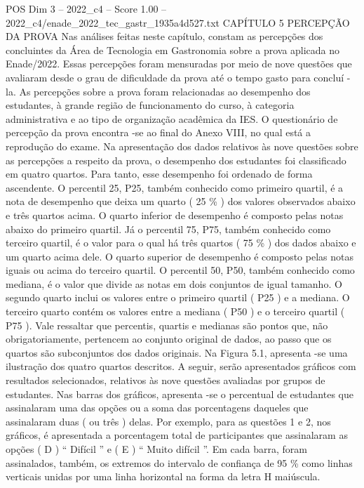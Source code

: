 \begin{textsample}{POS Dim 3 – 2022\_c4 – Score 1.00 – 2022\_c4/enade\_2022\_tec\_gastr\_1935a4d527.txt}  \label{ex:f3_pos_176}
CAPÍTULO 5 PERCEPÇÃO DA PROVA Nas análises feitas neste capítulo, constam as percepções dos concluintes da Área de Tecnologia em Gastronomia sobre a prova aplicada no Enade/2022.
Essas percepções foram mensuradas por meio de nove questões que avaliaram desde o grau de dificuldade da prova até o tempo gasto para concluí -la.
As percepções sobre a prova foram relacionadas ao desempenho dos estudantes, à grande região de funcionamento do curso, à categoria administrativa e ao tipo de organização acadêmica da IES.
O questionário de percepção da prova encontra -se ao final do Anexo VIII, no qual está a reprodução do exame.
Na apresentação dos dados relativos às nove questões sobre as percepções a respeito da prova, o desempenho dos estudantes foi classificado em quatro quartos.
Para tanto, esse desempenho foi ordenado de forma ascendente.
O percentil 25, P25, também conhecido como primeiro quartil, é a nota de desempenho que deixa um quarto ( 25 \% ) dos valores observados abaixo e três quartos acima.
O quarto inferior de desempenho é composto pelas notas abaixo do primeiro quartil.
Já o percentil 75, P75, também conhecido como terceiro quartil, é o valor para o qual há três quartos ( 75 \% ) dos dados abaixo e um quarto acima dele.
O quarto superior de desempenho é composto pelas notas iguais ou acima do terceiro quartil.
O percentil 50, P50, também conhecido como mediana, é o valor que divide as notas em dois conjuntos de igual tamanho.
O segundo quarto inclui os valores entre o primeiro quartil ( P25 ) e a mediana.
O terceiro quarto contém os valores entre a mediana ( P50 ) e o terceiro quartil ( P75 ).
Vale ressaltar que percentis, quartis e medianas são pontos que, não obrigatoriamente, pertencem ao conjunto original de dados, ao passo que os quartos são subconjuntos dos dados originais.
Na Figura 5.1, apresenta -se uma ilustração dos quatro quartos descritos.
A seguir, serão apresentados gráficos com resultados selecionados, relativos às nove questões avaliadas por grupos de estudantes.
Nas barras dos gráficos, apresenta -se o percentual de estudantes que assinalaram uma das opções ou a soma das porcentagens daqueles que assinalaram duas ( ou três ) delas.
Por exemplo, para as questões 1 e 2, nos gráficos, é apresentada a porcentagem total de participantes que assinalaram as opções ( D ) “ Difícil ” e ( E ) “ Muito difícil ”.
Em cada barra, foram assinalados, também, os extremos do intervalo de confiança de 95 \% como linhas verticais unidas por uma linha horizontal na forma da letra H maiúscula.

\end{textsample}
